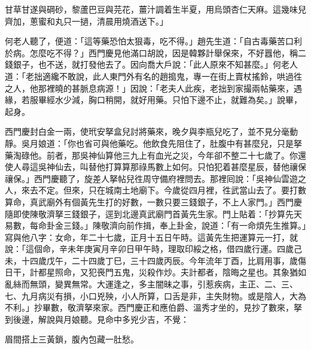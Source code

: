 \begin{myquote}
甘草甘遂與碙砂，黎蘆巴豆與芫花，薑汁調着生半夏，用烏頭杏仁天麻。這幾味兒齊加，蔥蜜和丸只一撾，清晨用燒酒送下。」
\end{myquote}

何老人聽了，便道：「這等藥恐怕太狠毒，吃不得。」趙先生道：「自古毒藥苦口利於病。怎麼吃不得？」西門慶見他滿口胡說，因是韓夥計舉保來，不好囂他，稱二錢銀子，也不送，就打發他去了。因向喬大戶說：「此人原來不知甚麼。」何老人道：「老拙適纔不敢說，此人東門外有名的趙搗鬼，專一在街上賣杖搖鈴，哄過徃之人，他那裡曉的甚脈息病源！」因說：「老夫人此疾，老拙到家撮兩帖藥來，遇緣，若服畢經水少減，胸口稍開，就好用藥。只怕下邊不止，就難為矣。」說畢，起身。

西門慶封白金一兩，使玳安拏盒兒討將藥來，晚夕與李瓶兒吃了，並不見分毫動靜。吳月娘道：「你也省可與他藥吃。他飲食先阻住了，肚腹中有甚麼兒，只是拏藥淘碌他。{}前者，那吳神仙算他三九上有血光之災，今年卻不整二十七歲了。你還使人尋這吳神仙去，叫替他打算算那祿馬數上如何。只怕犯着甚麼星辰，替他禳保禳保。」西門慶聽了，旋差人拏帖兒徃周守備府裡問去。那裡囘說：「吳神仙雲遊之人，來去不定。但來，只在城南土地廟下。今歲從四月裡，徃武當山去了。要打數算命，真武廟外有個黃先生打的好數，一數只要三錢銀子，不上人家門。」西門慶隨即使陳敬濟拏三錢銀子，逕到北邊真武廟門首黃先生家。{}門上貼着：「抄算先天易數，每命卦金三錢。」陳敬濟向前作揖，奉上卦金，說道：「有一命煩先生推算。」寫與他八字：女命，年二十七歲，正月十五日午時。這黃先生把運算元一打，就說：「這個命，辛未年庚寅月辛卯日甲午時，理取印綏之格，借四歲行運。四歲己未，十四歲戊午，二十四歲丁巳，三十四歲丙辰。今年流年丁酉，比肩用事，歲傷日干，計都星照命，又犯䘮門五鬼，災殺作炒。夫計都者，陰晦之星也。其象猶如亂絲而無頭，變異無常。大運逢之，多主闇昧之事，引惹疾病，主正、二、三、七、九月病災有損，小口兇殃，小人所算，口舌是非，主失財物。或是陰人，大為不利。」{}抄畢數，敬濟拏來家。西門慶正和應伯爵、溫秀才坐的，見抄了數來，拏到後邊，解說與月娘聽。見命中多兇少吉，不覺：

\begin{myquote}
眉間搭上三黃鎖，腹內包藏一肚愁。
\end{myquote}

